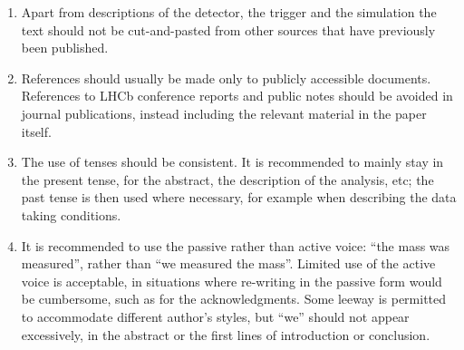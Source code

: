 \begin{enumerate}
\item Apart from descriptions of the detector, the trigger and the
  simulation the text should not be cut-and-pasted from other sources
  that have previously been published.

\item References should usually be made only to publicly accessible
  documents. References to LHCb conference reports and public notes
  should be avoided in journal publications, instead including the
  relevant material in the paper itself.

\item The use of tenses should be consistent. It is recommended to
  mainly stay in the present tense, for the abstract, the description
  of the analysis, etc; the past tense is then used where necessary,
  for example when describing the data taking conditions.

\item It is recommended to use the passive rather than active voice:
  ``the mass was measured'', rather than ``we measured the mass''.
  Limited use of the active voice is acceptable, in situations where
  re-writing in the passive form would be cumbersome, such as for the
  acknowledgments.  Some leeway is permitted to accommodate different
  author's styles, but ``we'' should not appear excessively, in the
  abstract or the first lines of introduction or conclusion.

\end{enumerate}
